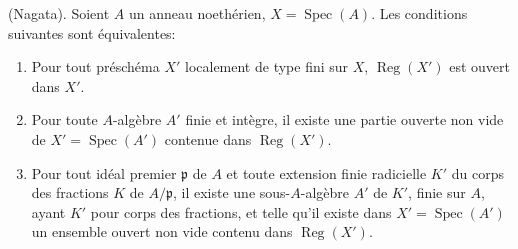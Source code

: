 \begin{theorem}[6.12.4]
\label{IV.2.s6.12.4-fr}
(Nagata). Soient $A$ un anneau noethérien,
$X=\operatorname{Spec}(A)$. Les conditions suivantes sont équivalentes:
\begin{enumerate}
\item[\textup{a)}] Pour tout préschéma $X'$ localement de type fini sur $X$,
$\operatorname{Reg}(X')$ est ouvert dans $X'$.
\item[\textup{b)}] Pour toute $A$-algèbre $A'$ finie et intègre, il existe une
partie ouverte non vide de $X'=\operatorname{Spec}(A')$ contenue dans
$\operatorname{Reg}(X')$.
\item[\textup{c)}] Pour tout idéal premier $\mathfrak p$ de $A$ et toute extension
finie radicielle $K'$ du corps des fractions $K$ de $A/\mathfrak p$, il
existe une sous-$A$-algèbre $A'$ de $K'$, finie sur $A$, ayant $K'$ pour
corps des fractions, et telle qu'il existe dans
$X'=\operatorname{Spec}(A')$ un ensemble ouvert non vide contenu dans
$\operatorname{Reg}(X')$.
\end{enumerate}
\end{theorem}

